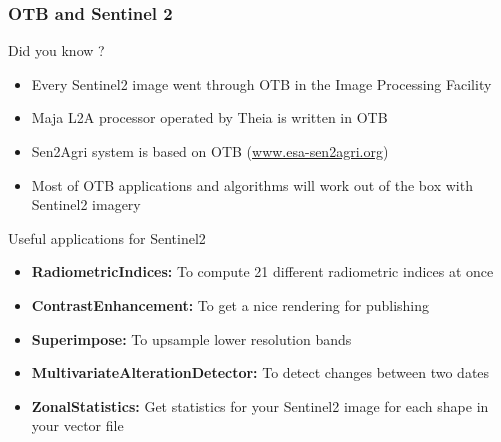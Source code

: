 \documentclass[8pt,aspectratio=169]{beamer}
\begin{document}
      \begin{frame}
        \frametitle{OTB and Sentinel 2}

        \begin{block}{Did you know ?}
          \begin{itemize}
          \item Every Sentinel2 image went through OTB in the Image Processing Facility
          \item Maja L2A processor operated by Theia is written in OTB
          \item Sen2Agri system is based on OTB (\url{www.esa-sen2agri.org})
          \item Most of OTB applications and algorithms will work out of the box with Sentinel2 imagery
          \end{itemize}
        \end{block}
        \begin{block}{Useful applications for Sentinel2}
          \begin{itemize}
          \item \textbf{RadiometricIndices:} To compute 21 different radiometric indices at once
          \item \textbf{ContrastEnhancement:} To get a nice rendering for publishing
          \item \textbf{Superimpose:} To upsample lower resolution bands 
          \item \textbf{MultivariateAlterationDetector:} To detect changes between two dates
          \item \textbf{ZonalStatistics:} Get statistics for your Sentinel2 image for each shape in your vector file
            \end{itemize}
          \end{block}
      \end{frame}
      
\end{document}
